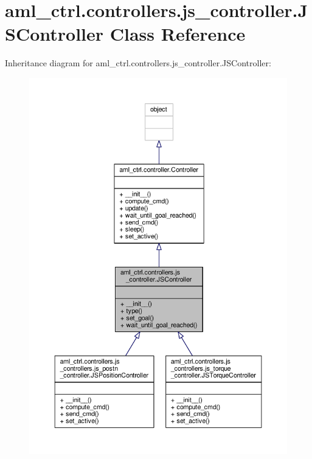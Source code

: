 \hypertarget{classaml__ctrl_1_1controllers_1_1js__controller_1_1_j_s_controller}{\section{aml\-\_\-ctrl.\-controllers.\-js\-\_\-controller.\-J\-S\-Controller Class Reference}
\label{classaml__ctrl_1_1controllers_1_1js__controller_1_1_j_s_controller}
}


Inheritance diagram for aml\-\_\-ctrl.\-controllers.\-js\-\_\-controller.\-J\-S\-Controller\-:\nopagebreak
\begin{figure}[H]
\begin{center}
\leavevmode
\includegraphics[width=350pt]{classaml__ctrl_1_1controllers_1_1js__controller_1_1_j_s_controller__inherit__graph}
\end{center}
\end{figure}



